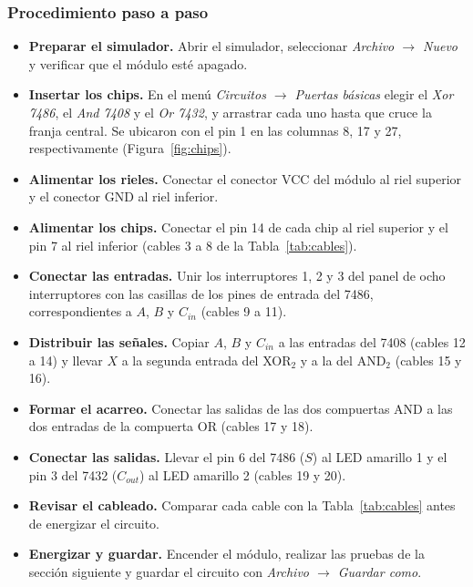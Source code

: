 \documentclass[10pt]{article}
\begin{document}
\subsubsection{Procedimiento paso a paso}

\begin{itemize}
  \item[\textbf{Paso 1.}] \textbf{Preparar el simulador.} Abrir el simulador,
        seleccionar \textit{Archivo $\rightarrow$ Nuevo} y verificar que el
        módulo esté apagado.

  \item[\textbf{Paso 2.}] \textbf{Insertar los chips.} En el menú
        \textit{Circuitos $\rightarrow$ Puertas básicas} elegir el
        \textit{Xor 7486}, el \textit{And 7408} y el \textit{Or 7432}, y
        arrastrar cada uno hasta que cruce la franja central. Se ubicaron con
        el pin 1 en las columnas 8, 17 y 27, respectivamente
        (Figura~\ref{fig:chips}).

  \item[\textbf{Paso 3.}] \textbf{Alimentar los rieles.} Conectar el conector
        VCC del módulo al riel superior y el conector GND al riel inferior.

  \item[\textbf{Paso 4.}] \textbf{Alimentar los chips.} Conectar el pin 14 de
        cada chip al riel superior y el pin 7 al riel inferior
        (cables 3 a 8 de la Tabla~\ref{tab:cables}).

  \item[\textbf{Paso 5.}] \textbf{Conectar las entradas.} Unir los
        interruptores 1, 2 y 3 del panel de ocho interruptores con las
        casillas de los pines de entrada del 7486, correspondientes a $A$, $B$
        y $C_{in}$ (cables 9 a 11).

  \item[\textbf{Paso 6.}] \textbf{Distribuir las señales.} Copiar $A$, $B$ y
        $C_{in}$ a las entradas del 7408 (cables 12 a 14) y llevar $X$ a la
        segunda entrada del XOR$_2$ y a la del AND$_2$ (cables 15 y 16).

  \item[\textbf{Paso 7.}] \textbf{Formar el acarreo.} Conectar las salidas de las
        dos compuertas AND a las dos entradas de la compuerta OR
        (cables 17 y 18).

  \item[\textbf{Paso 8.}] \textbf{Conectar las salidas.} Llevar el pin 6 del
        7486 ($S$) al LED amarillo 1 y el pin 3 del 7432 ($C_{out}$) al LED
        amarillo 2 (cables 19 y 20).

  \item[\textbf{Paso 9.}] \textbf{Revisar el cableado.} Comparar cada cable con
        la Tabla~\ref{tab:cables} antes de energizar el circuito.

  \item[\textbf{Paso 10.}] \textbf{Energizar y guardar.} Encender el módulo,
        realizar las pruebas de la sección siguiente y guardar el circuito con
        \textit{Archivo $\rightarrow$ Guardar como}.
\end{itemize}
\end{document}
